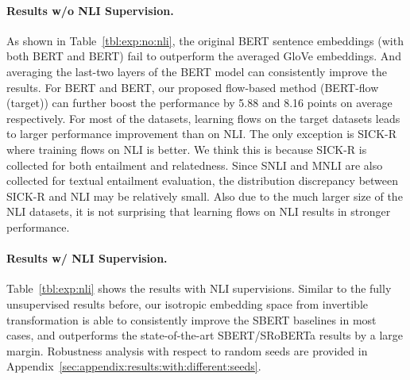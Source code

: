 \documentclass[11pt,a4paper]{article}
\begin{document}
\begin{table*}[ht]
\begin{center}
{\begin{tabular}{l llllllll}
\bottomrule
\end{tabular}
}
\caption{
Experimental results on semantic textual similarity \textit{with} NLI supervision. Note that our flows are still learned in a \textit{unsupervised} way. 
InferSent~\citep{conneau-EtAl:2017:EMNLP2017} is a siamese LSTM train on NLI, Universal Sentence Encoder (USE)~\citep{cer2018universal} replace the LSTM with a Transformer and SBERT~\cite{reimers2019sentence} further use BERT.
We report the Spearman's rank correlation between the cosine similarity of sentence embeddings and the gold labels on multiple datasets. Numbers are reported as .  denotes outperformance over its BERT baseline and  denotes underperformance. Our proposed BERT-flow (i.e., the ``BERT-NLI-flow'' in this table) method achieves the best scores. Note that our BERT-flow use \textit{-last2avg} as default setting. : Use NLI corpus for the unsupervised training of flow; supervision labels of NLI are NOT visible.}
\label{tbl:exp:nli}
\end{center}
\vspace{-10pt}
\end{table*}

\paragraph{Results w/o NLI Supervision. } 
As shown in Table~\ref{tbl:exp:no:nli}, the original BERT sentence embeddings (with both BERT and BERT) fail to outperform the averaged GloVe embeddings. 
And averaging the last-two layers of the BERT model can consistently improve the results. For BERT and BERT, our proposed flow-based method (BERT-flow (target)) can further boost the performance by 5.88 and 8.16 points on average respectively.
For most of the datasets, learning flows on the target datasets leads to larger performance improvement than on NLI. The only exception is SICK-R where training flows on NLI is better. We think this is because SICK-R is collected for both entailment and relatedness. 
Since SNLI and MNLI are also collected for textual entailment evaluation, the distribution discrepancy between SICK-R and NLI may be relatively small. Also due to the much larger size of the NLI datasets, it is not surprising that learning flows on NLI results in stronger performance.

\paragraph{Results w/ NLI Supervision.}
Table~\ref{tbl:exp:nli} shows the results with NLI supervisions. Similar to the fully unsupervised results before, our isotropic embedding space from invertible transformation is able to consistently improve the SBERT baselines in most cases, and outperforms the state-of-the-art SBERT/SRoBERTa results by a large margin. Robustness analysis with respect to random seeds are provided in Appendix~\ref{sec:appendix:results:with:different:seeds}.
\end{document}
